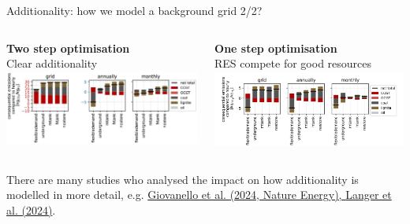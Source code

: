\begin{frame}{Additionality: how we model a background grid 2/2?}
\begin{columns}[t]
	\begin{column}{0.5\textwidth}
		\centering
		\textbf{Two step optimisation} \\
			Clear additionality
			\includegraphics[width=1\linewidth]{images/emissions_twostep_v2}		
	\end{column}
	\begin{column}{0.5\textwidth}
		\centering
		\textbf{One step optimisation} \\
		RES compete for good resources
			\includegraphics[width=1\linewidth]{images/onestepoptimisation}
	\end{column}
\end{columns}
 There are many studies who analysed the impact on how additionality is modelled in more detail, e.g. \href{https://www.nature.com/articles/s41560-023-01435-0}{Giovanello et al. (2024, Nature Energy), \href{https://papers.ssrn.com/sol3/papers.cfm?abstract_id=4636218}{Langer et al. (2024)}}.
\end{frame}

